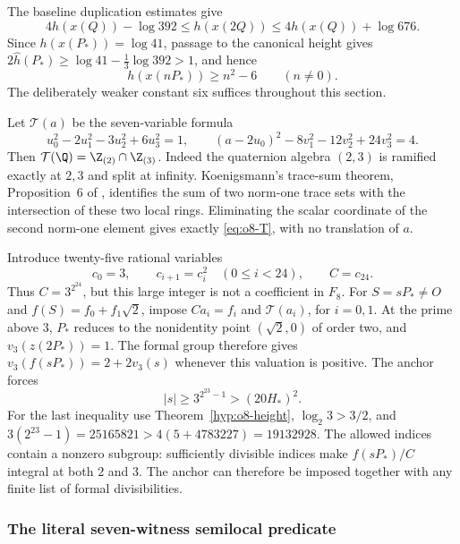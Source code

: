 The baseline duplication estimates give
\[
 4h(x(Q))-\log392\le h(x(2Q))
       \le4h(x(Q))+\log676.
\]
Since $h(x(P_*))=\log41$, passage to the canonical height gives
$2\widehat h(P_*)\ge\log41-\frac13\log392>1$, and hence
\begin{equation}\label{eq:o8-indexheight}
 h(x(nP_*))\ge n^2-6\qquad(n\ne0).
\end{equation}
The deliberately weaker constant six suffices throughout this section.

Let $\mathcal T(a)$ be the seven-variable formula
\begin{equation}\label{eq:o8-T}
 u_0^2-2u_1^2-3u_2^2+6u_3^2=1,\qquad
 (a-2u_0)^2-8v_1^2-12v_2^2+24v_3^2=4.
\end{equation}
Then $\mathcal T(\Q)=\Z_{(2)}\cap\Z_{(3)}$. Indeed the quaternion
algebra $(2,3)$ is ramified exactly at $2,3$ and split at infinity.
Koenigsmann's trace-sum theorem, Proposition~6 of
\cite{koenigsmann-defining}, identifies the sum of two norm-one trace
sets with the intersection of these two local rings. Eliminating the
scalar coordinate of the second norm-one element gives exactly
\eqref{eq:o8-T}, with no translation of $a$.

Introduce twenty-five rational variables
\begin{equation}\label{eq:o8-chain}
 c_0=3,\qquad c_{i+1}=c_i^2\quad(0\le i<24),\qquad C=c_{24}.
\end{equation}
Thus $C=3^{2^{24}}$, but this large integer is not a coefficient in
$F_8$. For $S=sP_*\ne O$ and $f(S)=f_0+f_1\sqrt2$, impose
$Ca_i=f_i$ and $\mathcal T(a_i)$, for $i=0,1$.
At the prime above $3$, $P_*$ reduces to the nonidentity point
$(\sqrt2,0)$ of order two, and $v_3(z(2P_*))=1$.
The formal group therefore gives
$v_3(f(sP_*))=2+2v_3(s)$ whenever this valuation is positive.
The anchor forces
\begin{equation}\label{eq:o8-anchor-bound}
 |s|\ge3^{2^{23}-1}>(20H_*)^2.
\end{equation}
For the last inequality use Theorem~\ref{hyp:o8-height},
$\log_2 3>3/2$, and
$3(2^{23}-1)=25165821>4(5+4783227)=19132928$.
The allowed indices contain a nonzero subgroup: sufficiently divisible
indices make $f(sP_*)/C$ integral at both $2$ and $3$. The anchor can
therefore be imposed together with any finite list of formal divisibilities.

\subsubsection{The literal seven-witness semilocal predicate}\label{subsec:o8-anchor-proof}

